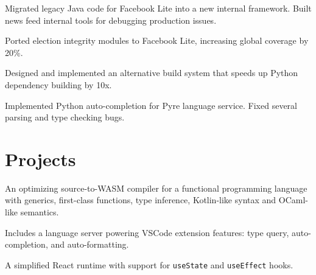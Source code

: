 \documentclass[]{res}
\begin{document}
\begin{tightemize}
    \item Migrated legacy Java code for Facebook Lite into a new internal framework. Built news feed internal tools for debugging production issues.
    \item Ported election integrity modules to Facebook Lite, increasing global coverage by 20\%.
\end{tightemize}
\sectionsep

\begin{tightemize}
    \item Designed and implemented an alternative build system that speeds up Python dependency building by 10x.
    \item Implemented Python auto-completion for Pyre language service. Fixed several parsing and type checking bugs.
\end{tightemize}
\sectionsep


\section{Projects}

\sectionsep

\begin{tightemize}
    \item An optimizing source-to-WASM compiler for a functional programming language with generics, first-class functions, type inference, Kotlin-like syntax and OCaml-like semantics.
    \item Includes a language server powering VSCode extension features: type query, auto-completion, and auto-formatting.
\end{tightemize}
\sectionsep

\begin{tightemize}
    \item A simplified React runtime with support for \texttt{useState} and \texttt{useEffect} hooks.
\end{tightemize}
\sectionsep
\end{document}
